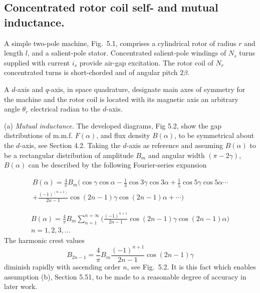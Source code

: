 \documentclass[a4paper,numbers=noenddot,12pt]{scrbook}
\begin{document}
\subsection{Concentrated rotor coil self- and mutual inductance.}
A simple two-pole machine, Fig.\ 5.1, comprises a cylindrical rotor of radius $r$ and length $l$, and a salient-pole stator. Concentrated salient-pole windings of $N_s$ turns supplied with current $i_s$ provide air-gap excitation. The rotor coil of $N_r$ concentrated turns is short-chorded and of angular pitch $2\beta$.

A $d$-axis and $q$-axis, in space quadrature, designate main axes of symmetry for the machine and the rotor coil is located with its magnetic axis an arbitrary angle $\theta_r$ electrical radian to the $d$-axis.

\noindent (a) \textit{Mutual inductance.} The developed diagrams, Fig 5.2, show the gap distributions of m.m.f. $F(\alpha)$, and flux density $B(\alpha)$, to be symmetrical about the $d$-axis, see Section 4.2. Taking the $d$-axis as reference and assuming $B(\alpha)$ to be a rectangular distribution of amplitude $B_m$ and angular width $(\pi-2\gamma)$, $B(\alpha)$ can be described by the following Fourier-series expansion

\begin{multline}
    B(\alpha)=\frac{4}{\pi}B_m(\cos \gamma \cos \alpha-\frac{1}{3}\cos 3\gamma \cos 3\alpha+\frac{1}{5}\cos 5\gamma \cos 5\alpha \cdots \\ + \frac{{(-1)}^{(n+1)}}{2n-1}\cos(2n-1)\gamma \cos(2n-1)\alpha+\cdots)
    \label{eq:Ecu1}
\end{multline}

\begin{multline}
    B{(\alpha)} = \frac{4}{\pi} B_m \displaystyle \sum_{n=1}^{n=\infty} \bigg( \frac{{(-1)}^{n+1}}{2n-1} \cos(2n-1)\gamma \cos(2n-1)\alpha \bigg) \\ n=1,2,3,\ldots
\end{multline}
The harmonic crest values
\begin{equation}
    B_{2n-1} = \frac{4}{\pi} B_m \frac{{(-1)}^{n+1}}{2n-1} \cos(2n-1)\gamma
\end{equation}
diminish rapidly with ascending order $n$, see Fig.\ 5.2. It is this fact which enables assumption (b), Section 5.51, to be made to a reasonable degree of accuracy in later work.
\end{document}
